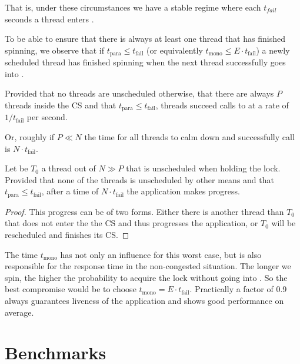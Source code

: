 That is, under these circumstances we have a stable regime where each
$t_{fail}$ seconds a thread enters .

To be able to ensure that there is always at least one thread that
has finished spinning, we observe that if $t_{\textrm{para}} \leq
    t_{\textrm{fail}}$ (or equivalently $t_{\textrm{mono}} \leq E\cdot
    t_{\textrm{fail}}$) a newly scheduled thread has finished spinning
when the next thread successfully goes into .

\begin{lemma}
Provided that no threads are unscheduled otherwise, that there are
always $P$ threads inside the CS and that $t_{\textrm{para}} \leq
    t_{\textrm{fail}}$, threads succeed calls to  at a rate of
$1/t_{\textrm{fail}}$ per second.
\end{lemma}

Or, roughly if $P \ll N$ the time for all threads to calm down and
successfully call  is $N\cdot t_{\textrm{fail}}$.

\begin{theorem}
Let be $T_0$ a thread out of $N \gg P$ that is unscheduled when
holding the lock.  Provided that none of the threads is
unscheduled by other means and that $t_{\textrm{para}} \leq
    t_{\textrm{fail}}$, after a time of $N\cdot t_{\textrm{fail}}$ the
application makes progress.
\end{theorem}

\begin{proof}
This progress can be of two forms.  Either there is another thread
than $T_{0}$ that does not enter the the CS and thus
progresses the application, or $T_0$ will be rescheduled and
finishes its CS.
\end{proof}

The time $t_{\textrm{mono}}$ has not only an influence for this
worst case, but is also responsible for the response time in the
non-congested situation. The longer we spin, the higher the
probability to acquire the lock without going into
. So the best compromise would be to choose
$t_{\textrm{mono}} = E\cdot t_{\textrm{fail}}$. Practically a
factor of 0.9 always guarantees liveness of the application and
shows good performance on average.

\section{Benchmarks}
\label{sec-4}

